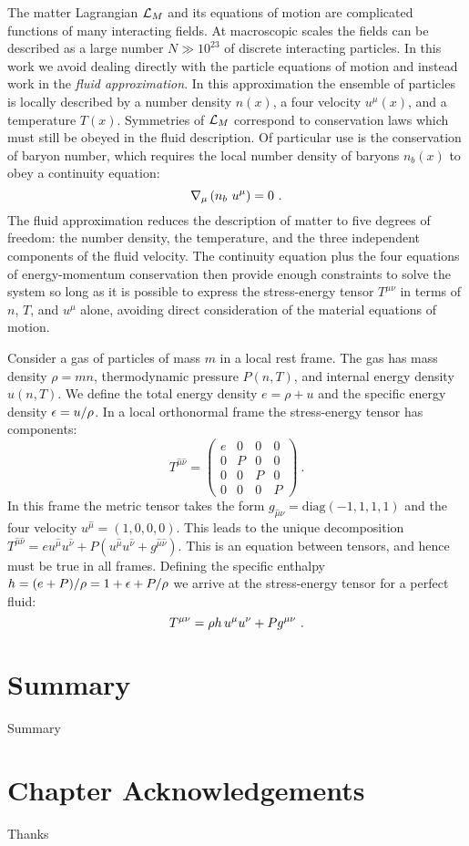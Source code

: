    The matter Lagrangian $\mathcal{L}_M$ and its equations of motion are complicated functions of many interacting fields.  At macroscopic scales the fields can be described as a large number $N \gg 10^{23}$ of discrete interacting particles.  In this work we avoid dealing directly with the particle equations of motion and instead work in the \emph{fluid approximation}.    In this approximation the ensemble of particles is locally described by a number density $n(x)$, a four velocity $u^\mu(x)$, and a temperature $T(x)$.  Symmetries of $\mathcal{L}_M$ correspond to conservation laws which must still be obeyed in the fluid description.  Of particular use is the conservation of baryon number, which requires the local number density of baryons $n_b(x)$ to obey a continuity equation:
   \begin{equation}
   	\nabla_\mu \left(n_b\ u^\mu\right) = 0 \eqlabel{contnb}\ .
   \end{equation}
  The fluid approximation reduces the description of matter to five degrees of freedom: the number density, the temperature, and the three independent components of the fluid velocity.  The continuity equation  plus the four equations of energy-momentum conservation  then provide enough constraints to solve the system so long as it is possible to express the stress-energy tensor $T^{\mu\nu}$ in terms of $n$, $T$, and $u^\mu$ alone, avoiding direct consideration of the material equations of motion.
  
  Consider a gas of particles of mass $m$ in a local rest frame. The gas has mass density $\rho = m n$, thermodynamic pressure $P(n,T)$, and internal energy density $u(n,T)$.  We define the total energy density $e = \rho + u$ and the specific energy density $\epsilon = u / \rho$.  In a local orthonormal frame the stress-energy tensor has components:
  \begin{equation}
  	T^{\hat{\mu}\hat{\nu}} = \begin{pmatrix} e & 0 & 0 & 0 \\
									0 & P & 0 & 0 \\
									0 & 0 & P & 0 \\
									0 & 0 & 0 & P \end{pmatrix}\ .
  \end{equation}
In this frame the metric tensor takes the form $g_{\hat{\mu}\hat{\nu}} = \text{diag}(-1,1,1,1)$ and the four velocity $u^{\hat{\mu}}  = (1,0,0,0)$.  This leads to the unique decomposition $T^{\hat{\mu}\hat{\nu}} = e u^{\hat{\mu}}u^{\hat{\nu}} + P ( u^{\hat{\mu}}u^{\hat{\nu}} + g^{\hat{\mu}\hat{\nu}})$.  This is an equation between tensors, and hence must be true in all frames. Defining the specific enthalpy $h = (e+P)/\rho = 1 + \epsilon + P/\rho$ we arrive at the stress-energy tensor for a perfect fluid:
\begin{equation}
	T^{\mu\nu} = \rho h \ \! u^\mu u^\nu + P g^{\mu\nu} \eqlabel{defTgas}\ .
\end{equation}

\section{Summary}


Summary

\section{Chapter Acknowledgements} 

Thanks